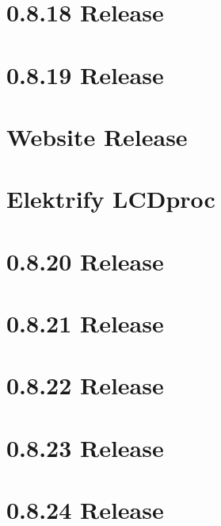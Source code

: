 \let\mypdfximage\pdfximage\def\pdfximage{\immediate\mypdfximage}\documentclass[twoside]{book}
\newcommand{\+}{\discretionary{\mbox{\scriptsize$\hookleftarrow$}}{}{}}
\begin{document}
\chapter{0.8.18 Release}
\label{doc_news_2016-09-17_0_8_18_md}

\chapter{0.8.19 Release}
\label{doc_news_2016-11-22_0_8_19_md}

\chapter{Website Release}
\label{doc_news_2016-12-17_website_release_md}

\chapter{Elektrify L\+C\+Dproc}
\label{doc_news_2017-03-18_lcdproc_md}

\chapter{0.8.20 Release}
\label{doc_news_2017-10-31_0_8_20_md}

\chapter{0.8.21 Release}
\label{doc_news_2017-12-22_0_8_21_md}

\chapter{0.8.22 Release}
\label{doc_news_2018-03-27_0_8_22_md}

\chapter{0.8.23 Release}
\label{doc_news_2018-05-13_0_8_23_md}

\chapter{0.8.24 Release}
\label{doc_news_2018-08-18_0_8_24_md}

\end{document}
